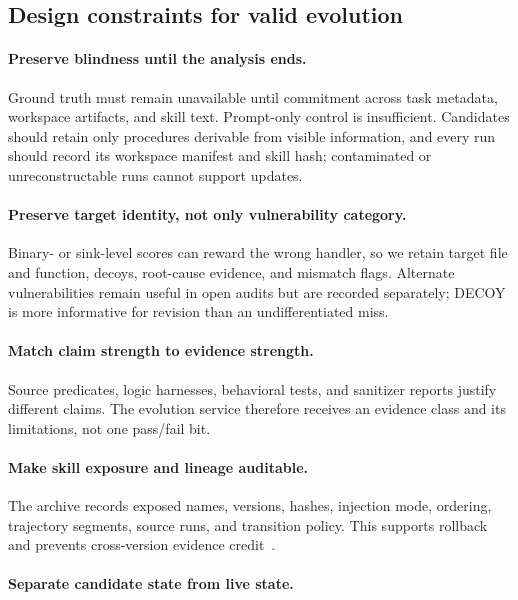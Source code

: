 \documentclass[11pt]{article}
\begin{document}
\subsection{Design constraints for valid evolution}
\label{sec:principles}

\paragraph{Preserve blindness until the analysis ends.}

Ground truth must remain unavailable until commitment across task metadata, workspace
artifacts, and skill text.  Prompt-only control is insufficient.  Candidates should
retain only procedures derivable from visible information, and every run should record
its workspace manifest and skill hash; contaminated or unreconstructable runs cannot
support updates.

\paragraph{Preserve target identity, not only vulnerability category.}

Binary- or sink-level scores can reward the wrong handler, so we retain target file and
function, decoys, root-cause evidence, and mismatch flags.  Alternate vulnerabilities
remain useful in open audits but are recorded separately; DECOY is more informative for
revision than an undifferentiated miss.

\paragraph{Match claim strength to evidence strength.}

Source predicates, logic harnesses, behavioral tests, and sanitizer reports justify
different claims.  The evolution service therefore receives an evidence class and its
limitations, not one pass/fail bit.

\paragraph{Make skill exposure and lineage auditable.}

The archive records exposed names, versions, hashes, injection mode, ordering, trajectory
segments, source runs, and transition policy.  This supports rollback and prevents
cross-version evidence credit~\cite{dynamicskills,skillwiki,harnesssafe}.

\paragraph{Separate candidate state from live state.}
\end{document}
